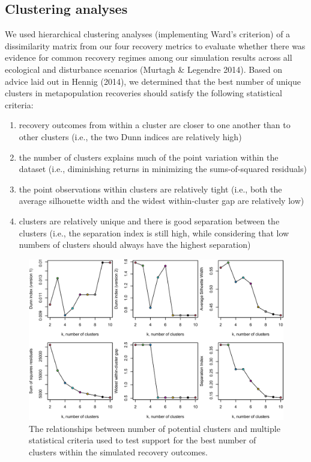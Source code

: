 \documentclass[
]{article}
\providecommand{\tightlist}{%
  \setlength{\itemsep}{0pt}\setlength{\parskip}{0pt}}
\begin{document}
\newpage

\hypertarget{clustering-analyses}{%
\subsection{Clustering analyses}\label{clustering-analyses}}

We used hierarchical clustering analyses (implementing Ward's criterion)
of a dissimilarity matrix from our four recovery metrics to evaluate
whether there was evidence for common recovery regimes among our
simulation results across all ecological and disturbance scenarios
(Murtagh \& Legendre 2014). Based on advice laid out in Hennig (2014),
we determined that the best number of unique clusters in metapopulation
recoveries should satisfy the following statistical criteria:

\begin{enumerate}
\def\labelenumi{\arabic{enumi}.}
\tightlist
\item
  recovery outcomes from within a cluster are closer to one another than
  to other clusters (i.e., the two Dunn indices are relatively high)
\item
  the number of clusters explains much of the point variation within the
  dataset (i.e., diminishing returns in minimizing the sums-of-squared
  residuals)
\item
  the point observations within clusters are relatively tight (i.e.,
  both the average silhouette width and the widest within-cluster gap
  are relatively low)
\item
  clusters are relatively unique and there is good separation between
  the clusters (i.e., the separation index is still high, while
  considering that low numbers of clusters should always have the
  highest separation)
\end{enumerate}

\begin{figure}[H]

{\centering \includegraphics{Managing_for_ecological_surprises_in_metapopulations_files/figure-latex/clustering analysis-1} 

}

\caption{The relationships between number of potential clusters and multiple statistical criteria used to test support for the best number of clusters within the simulated recovery outcomes.}\label{fig:clustering analysis}
\end{figure}
\end{document}
